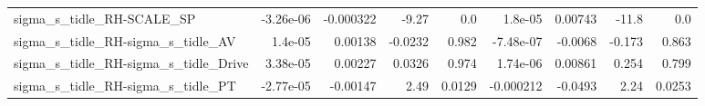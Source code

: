 \begin{tabular}{lrrrrrrrr}
sigma\_s\_tidle\_RH-SCALE\_SP                          &   -3.26e-06 &    -0.000322 &     -9.27 &      0.0 &    1.8e-05 &     0.00743 &        -11.8 &           0.0 \\
sigma\_s\_tidle\_RH-sigma\_s\_tidle\_AV                  &     1.4e-05 &      0.00138 &   -0.0232 &    0.982 &  -7.48e-07 &     -0.0068 &       -0.173 &         0.863 \\
sigma\_s\_tidle\_RH-sigma\_s\_tidle\_Drive               &    3.38e-05 &      0.00227 &    0.0326 &    0.974 &   1.74e-06 &     0.00861 &        0.254 &         0.799 \\
sigma\_s\_tidle\_RH-sigma\_s\_tidle\_PT                  &   -2.77e-05 &     -0.00147 &      2.49 &   0.0129 &  -0.000212 &     -0.0493 &         2.24 &        0.0253 \\
\bottomrule
\end{tabular}
